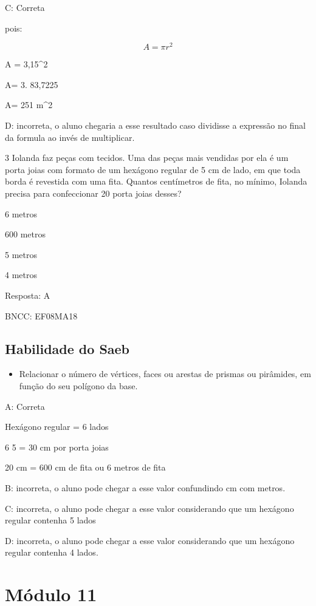 C: Correta

pois:

\[A = \pi r^{2}\]

A = 3,15^2

A= 3. 83,7225

A= 251 m^2

D: incorreta, o aluno chegaria a esse resultado caso dividisse a
expressão no final da formula ao invés de multiplicar.

\num{3} Iolanda faz peças com tecidos. Uma das peças mais vendidas por ela é
um porta joias com formato de um hexágono regular de 5 cm de lado, em
que toda borda é revestida com uma fita. Quantos centímetros de fita, no
mínimo, Iolanda precisa para confeccionar 20 porta joias desses?

\item 6 metros
\item 600 metros
\item 5 metros
\item 4 metros

Resposta: A

BNCC: EF08MA18

\section{Habilidade do Saeb}

\begin{itemize}
\tightlist

\item 
  Relacionar o número de vértices, faces ou arestas de prismas ou
  pirâmides, em função do seu polígono da base.
\end{itemize}

A: Correta

Hexágono regular = 6 lados

\num{6} 5 = 30 cm por porta joias

20 cm = 600 cm de fita ou 6 metros de fita

B: incorreta, o aluno pode chegar a esse valor confundindo cm com
metros.

C: incorreta, o aluno pode chegar a esse valor considerando que um
hexágono regular contenha 5 lados

D: incorreta, o aluno pode chegar a esse valor considerando que um
hexágono regular contenha 4 lados.

\chapter{Módulo 11}

